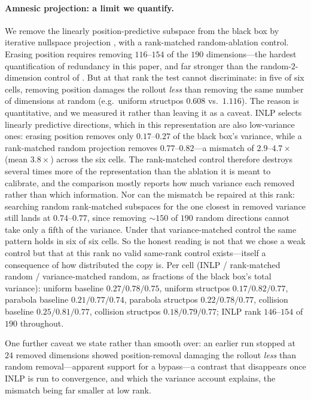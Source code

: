 \paragraph{Amnesic projection: a limit we quantify.}
We remove the linearly position-predictive subspace from the black box by iterative nullspace projection \citep{ravfogel2020inlp}, with a rank-matched random-ablation control. Erasing position requires removing $116$--$154$ of the $190$ dimensions---the hardest quantification of redundancy in this paper, and far stronger than the random-$2$-dimension control of . But at that rank the test cannot discriminate: in five of six cells, removing position damages the rollout \emph{less} than removing the same number of dimensions at random (e.g.\ uniform structpos $0.608$ vs.\ $1.116$). The reason is quantitative, and we measured it rather than leaving it as a caveat. INLP selects linearly predictive directions, which in this representation are also low-variance ones: erasing position removes only $0.17$--$0.27$ of the black box's variance, while a rank-matched random projection removes $0.77$--$0.82$---a mismatch of $2.9$--$4.7\times$ (mean $3.8\times$) across the six cells. The rank-matched control therefore destroys several times more of the representation than the ablation it is meant to calibrate, and the comparison mostly reports how much variance each removed rather than which information. Nor can the mismatch be repaired at this rank: searching random rank-matched subspaces for the one closest in removed variance still lands at $0.74$--$0.77$, since removing ${\sim}150$ of $190$ random directions cannot take only a fifth of the variance. Under that variance-matched control the same pattern holds in six of six cells. So the honest reading is not that we chose a weak control but that at this rank no valid same-rank control exists---itself a consequence of how distributed the copy is. Per cell (INLP / rank-matched random / variance-matched random, as fractions of the black box's total variance): uniform baseline $0.27/0.78/0.75$, uniform structpos $0.17/0.82/0.77$, parabola baseline $0.21/0.77/0.74$, parabola structpos $0.22/0.78/0.77$, collision baseline $0.25/0.81/0.77$, collision structpos $0.18/0.79/0.77$; INLP rank $146$--$154$ of $190$ throughout.

One further caveat we state rather than smooth over: an earlier run stopped at $24$ removed dimensions showed position-removal damaging the rollout \emph{less} than random removal---apparent support for a bypass---a contrast that disappears once INLP is run to convergence, and which the variance account explains, the mismatch being far smaller at low rank.

